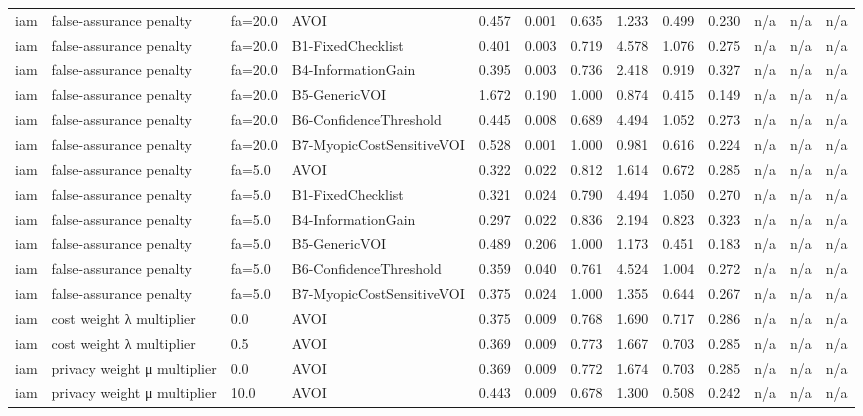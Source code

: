 \begin{table}[!ht]
{\begin{tabular}{lllllllllllll}
iam & false-assurance penalty & fa=20.0 & AVOI & 0.457 & 0.001 & 0.635 & 1.233 & 0.499 & 0.230 & n/a & n/a & n/a \\
iam & false-assurance penalty & fa=20.0 & B1-FixedChecklist & 0.401 & 0.003 & 0.719 & 4.578 & 1.076 & 0.275 & n/a & n/a & n/a \\
iam & false-assurance penalty & fa=20.0 & B4-InformationGain & 0.395 & 0.003 & 0.736 & 2.418 & 0.919 & 0.327 & n/a & n/a & n/a \\
iam & false-assurance penalty & fa=20.0 & B5-GenericVOI & 1.672 & 0.190 & 1.000 & 0.874 & 0.415 & 0.149 & n/a & n/a & n/a \\
iam & false-assurance penalty & fa=20.0 & B6-ConfidenceThreshold & 0.445 & 0.008 & 0.689 & 4.494 & 1.052 & 0.273 & n/a & n/a & n/a \\
iam & false-assurance penalty & fa=20.0 & B7-MyopicCostSensitiveVOI & 0.528 & 0.001 & 1.000 & 0.981 & 0.616 & 0.224 & n/a & n/a & n/a \\
iam & false-assurance penalty & fa=5.0 & AVOI & 0.322 & 0.022 & 0.812 & 1.614 & 0.672 & 0.285 & n/a & n/a & n/a \\
iam & false-assurance penalty & fa=5.0 & B1-FixedChecklist & 0.321 & 0.024 & 0.790 & 4.494 & 1.050 & 0.270 & n/a & n/a & n/a \\
iam & false-assurance penalty & fa=5.0 & B4-InformationGain & 0.297 & 0.022 & 0.836 & 2.194 & 0.823 & 0.323 & n/a & n/a & n/a \\
iam & false-assurance penalty & fa=5.0 & B5-GenericVOI & 0.489 & 0.206 & 1.000 & 1.173 & 0.451 & 0.183 & n/a & n/a & n/a \\
iam & false-assurance penalty & fa=5.0 & B6-ConfidenceThreshold & 0.359 & 0.040 & 0.761 & 4.524 & 1.004 & 0.272 & n/a & n/a & n/a \\
iam & false-assurance penalty & fa=5.0 & B7-MyopicCostSensitiveVOI & 0.375 & 0.024 & 1.000 & 1.355 & 0.644 & 0.267 & n/a & n/a & n/a \\
iam & cost weight λ multiplier & 0.0 & AVOI & 0.375 & 0.009 & 0.768 & 1.690 & 0.717 & 0.286 & n/a & n/a & n/a \\
iam & cost weight λ multiplier & 0.5 & AVOI & 0.369 & 0.009 & 0.773 & 1.667 & 0.703 & 0.285 & n/a & n/a & n/a \\
iam & privacy weight μ multiplier & 0.0 & AVOI & 0.369 & 0.009 & 0.772 & 1.674 & 0.703 & 0.285 & n/a & n/a & n/a \\
iam & privacy weight μ multiplier & 10.0 & AVOI & 0.443 & 0.009 & 0.678 & 1.300 & 0.508 & 0.242 & n/a & n/a & n/a \\

\end{tabular}}
\end{table}
